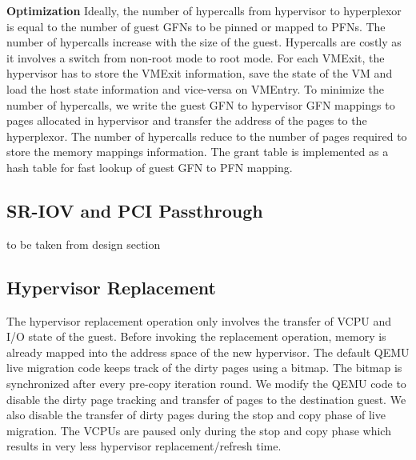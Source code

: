 \textbf{Optimization}
Ideally, the number of hypercalls from hypervisor to hyperplexor is equal to the number of guest GFNs to be pinned or mapped to PFNs. The number of hypercalls increase with the size of the guest. Hypercalls are costly as it involves a switch from non-root mode to root mode. For each VMExit, the hypervisor has to store the VMExit information, save the state of the VM and load the host state information and vice-versa on VMEntry. To minimize the number of hypercalls, we write the guest GFN to hypervisor GFN mappings to pages allocated in hypervisor and transfer the address of the pages to the hyperplexor. The number of hypercalls reduce to the number of pages required to store the memory mappings information. The grant table is implemented as a hash table for fast lookup of guest GFN to PFN mapping.

\subsection{SR-IOV and PCI Passthrough}
to be taken from design section

\subsection{Hypervisor Replacement}
The hypervisor replacement operation only involves the transfer of VCPU and I/O state of the guest. Before invoking the replacement operation, memory is already mapped into the address space of the new hypervisor. The default QEMU live migration code keeps track of the dirty pages using a bitmap. The bitmap is synchronized after every pre-copy iteration round. We modify the QEMU code to disable the dirty page tracking and transfer of pages to the destination guest. We also disable the transfer of dirty pages during the stop and copy phase of live migration. The VCPUs are paused only during the stop and copy phase which results in very less hypervisor replacement/refresh time. 
